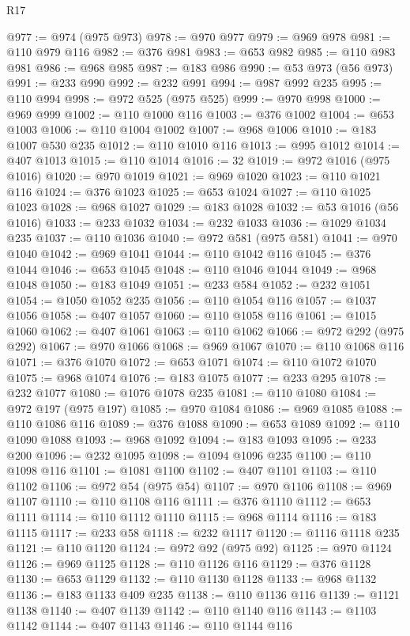 \begin{lexlean}{R17}
\begin{coremodule}
{{{{{{{{{{{{{{{{{{{{{{{{{{{{{{{{{{{{{{{{{{{{{{{{{{{{{{{{{{{{{{{{{{{{{{{{{{{{{{{{{{{{{@977 := @974 (@975 @973)
@978 := @970 @977
@979 := @969 @978
@981 := @110 @979 @116
@982 := @376 @981
@983 := @653 @982
@985 := @110 @983 @981
@986 := @968 @985
@987 := @183 @986
@990 := @53 @973 (@56 @973)
@991 := @233 @990
@992 := @232 @991
@994 := @987 @992 @235
@995 := @110 @994
@998 := @972 @525 (@975 @525)
@999 := @970 @998
@1000 := @969 @999
@1002 := @110 @1000 @116
@1003 := @376 @1002
@1004 := @653 @1003
@1006 := @110 @1004 @1002
@1007 := @968 @1006
@1010 := @183 @1007 @530 @235
@1012 := @110 @1010 @116
@1013 := @995 @1012
@1014 := @407 @1013
@1015 := @110 @1014
@1016 := 32
@1019 := @972 @1016 (@975 @1016)
@1020 := @970 @1019
@1021 := @969 @1020
@1023 := @110 @1021 @116
@1024 := @376 @1023
@1025 := @653 @1024
@1027 := @110 @1025 @1023
@1028 := @968 @1027
@1029 := @183 @1028
@1032 := @53 @1016 (@56 @1016)
@1033 := @233 @1032
@1034 := @232 @1033
@1036 := @1029 @1034 @235
@1037 := @110 @1036
@1040 := @972 @581 (@975 @581)
@1041 := @970 @1040
@1042 := @969 @1041
@1044 := @110 @1042 @116
@1045 := @376 @1044
@1046 := @653 @1045
@1048 := @110 @1046 @1044
@1049 := @968 @1048
@1050 := @183 @1049
@1051 := @233 @584
@1052 := @232 @1051
@1054 := @1050 @1052 @235
@1056 := @110 @1054 @116
@1057 := @1037 @1056
@1058 := @407 @1057
@1060 := @110 @1058 @116
@1061 := @1015 @1060
@1062 := @407 @1061
@1063 := @110 @1062
@1066 := @972 @292 (@975 @292)
@1067 := @970 @1066
@1068 := @969 @1067
@1070 := @110 @1068 @116
@1071 := @376 @1070
@1072 := @653 @1071
@1074 := @110 @1072 @1070
@1075 := @968 @1074
@1076 := @183 @1075
@1077 := @233 @295
@1078 := @232 @1077
@1080 := @1076 @1078 @235
@1081 := @110 @1080
@1084 := @972 @197 (@975 @197)
@1085 := @970 @1084
@1086 := @969 @1085
@1088 := @110 @1086 @116
@1089 := @376 @1088
@1090 := @653 @1089
@1092 := @110 @1090 @1088
@1093 := @968 @1092
@1094 := @183 @1093
@1095 := @233 @200
@1096 := @232 @1095
@1098 := @1094 @1096 @235
@1100 := @110 @1098 @116
@1101 := @1081 @1100
@1102 := @407 @1101
@1103 := @110 @1102
@1106 := @972 @54 (@975 @54)
@1107 := @970 @1106
@1108 := @969 @1107
@1110 := @110 @1108 @116
@1111 := @376 @1110
@1112 := @653 @1111
@1114 := @110 @1112 @1110
@1115 := @968 @1114
@1116 := @183 @1115
@1117 := @233 @58
@1118 := @232 @1117
@1120 := @1116 @1118 @235
@1121 := @110 @1120
@1124 := @972 @92 (@975 @92)
@1125 := @970 @1124
@1126 := @969 @1125
@1128 := @110 @1126 @116
@1129 := @376 @1128
@1130 := @653 @1129
@1132 := @110 @1130 @1128
@1133 := @968 @1132
@1136 := @183 @1133 @409 @235
@1138 := @110 @1136 @116
@1139 := @1121 @1138
@1140 := @407 @1139
@1142 := @110 @1140 @116
@1143 := @1103 @1142
@1144 := @407 @1143
@1146 := @110 @1144 @116
}}}}}}}}}}}}}}}}}}}}}}}}}}}}}}}}}}}}}}}}}}}}}}}}}}}}}}}}}}}}}}}}}}}}}}}}}}}}}}}}}}}}}
\end{coremodule}
\end{lexlean}
